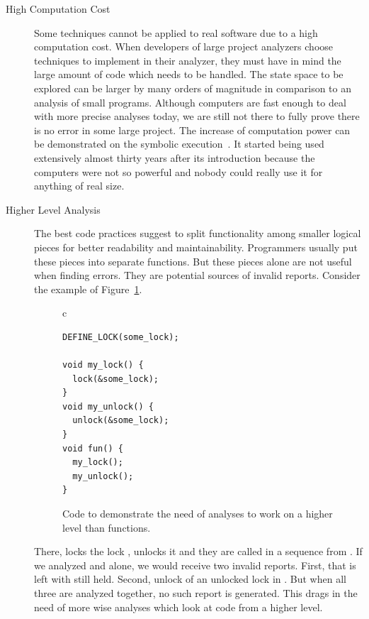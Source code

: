 \begin{description}
\item[High Computation Cost] Some techniques cannot be applied to real
software due to a high computation cost.  When developers of large project
analyzers choose techniques to implement in their analyzer, they must have in
mind the large amount of code which needs to be handled. The state space to
be explored can be larger by many orders of magnitude in comparison to an
analysis of small programs. Although computers are fast enough to deal with
more precise analyses today, we are still not there to fully prove there is no
error in some large project. The increase of computation power can be
demonstrated on the symbolic execution~\cite{se_king}. It started being used
extensively almost thirty years after its introduction because the computers
were not so powerful and nobody could really use it for anything of real size.

\item[Higher Level Analysis] The best code practices suggest to split
functionality among smaller logical pieces for better readability and
maintainability. Programmers usually put these pieces into separate functions.
But these pieces alone are not useful when finding errors. They are potential
sources of invalid reports. Consider the example of
Figure~\ref{fig:intro_need_context}.
\begin{figure}[htb]
\begin{center}
\begin{tabular}{c}
\begin{lstlisting}
DEFINE_LOCK(some_lock);

void my_lock() {
  lock(&some_lock);
}
void my_unlock() {
  unlock(&some_lock);
}
void fun() {
  my_lock();
  my_unlock();
}
\end{lstlisting}
\end{tabular}
\end{center}
\caption{Code to demonstrate the need of analyses to work on a higher level
than functions.}
\label{fig:intro_need_context}
\end{figure}
There,  locks the lock , 
unlocks it and they are called in a sequence from .
If we analyzed  and  alone, we would receive two
invalid reports. First, that  is left with 
still held. Second, unlock of an unlocked lock in . But when
all three are analyzed together, no such report is generated. This drags in
the need of more wise analyses which look at code from a higher level.


\end{description}
